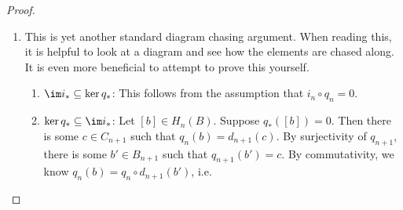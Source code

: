 \documentclass[a4paper]{article}
\theoremstyle{definition}
\begin{document}
\begin{proof}
\begin{enumerate}
\begin{enumerate}
\begin{align*}
            &= i_{n - 1} \circ d_n (a) + d_n(y).
          \end{align*}
          Hence when we pull back $d_n(y')$ and $d_n(y)$ to $A_{n - 1}$, the results differ by the boundary $d_n(a)$, and hence produce the same homology class.
        \item Suppose $[x'] = [x]$. We want to show that $\partial_* [x] = \partial_*[x']$. This time, we add a layer above.
          \[
            \begin{tikzcd}
              0 \ar[r] & A_{n + 1} \ar[r, "i_{n + 1}"] \ar[d, "d_{n + 1}"] & B_{n + 1} \ar[r, "q_{n + 1}"] \ar[d, "d_{n + 1}"] & C_{n + 1} \ar[r] \ar[d, "d_{n + 1}"] & 0\\
              0 \ar[r] & A_n \ar[r, "i_n"] \ar[d, "d_n"] & B_n \ar[r, "q_n"] \ar[d, "d_n"] & C_n \ar[r] \ar[d, "d_n"] & 0\\
              0 \ar[r] & A_{n - 1} \ar[r, "i_{n - 1}"] & B_{n - 1} \ar[r, "q_{n - 1}"] & C_{n - 1} \ar[r] & 0
            \end{tikzcd}
          \]
          By definition, since $[x'] = [x]$, there is some $c \in C_{n + 1}$ such that
          \[
            x' = x + d_{n + 1} (c).
          \]
          By surjectivity of $q_{n + 1}$, we can write $c = q_{n + 1}(b)$ for some $b \in B_{n + 1}$. By commutativity of the squares, we know
          \[
            x' = x + q_n \circ d_{n + 1} (b).
          \]
          The next step of the proof is to find some $y$ such that $q_n (y) = x$. Then
          \[
            q_n(y + d_{n + 1} (b)) = x'.
          \]
          So the corresponding $y'$ is $y' = y + d_{n + 1}(b)$. So $d_n (y) = d_n(y')$, and hence $\partial_*[x] = \partial_* [x']$.
      \end{enumerate}
    \item This is yet another standard diagram chasing argument. When reading this, it is helpful to look at a diagram and see how the elements are chased along. It is even more beneficial to attempt to prove this yourself.
      \begin{enumerate}
        \item $\im i_* \subseteq \ker q_*$: This follows from the assumption that $i_n \circ q_n = 0$.
        \item $\ker q_* \subseteq \im i_*$: Let $[b] \in H_n(B)$. Suppose $q_*([b]) = 0$. Then there is some $c \in C_{n + 1}$ such that $q_n(b) = d_{n + 1}(c)$. By surjectivity of $q_{n + 1}$, there is some $b' \in B_{n + 1}$ such that $q_{n + 1}(b') = c$. By commutativity, we know $q_n(b) = q_n \circ d_{n + 1}(b')$, i.e.

\end{enumerate}
\end{enumerate}
\end{proof}
\end{document}
